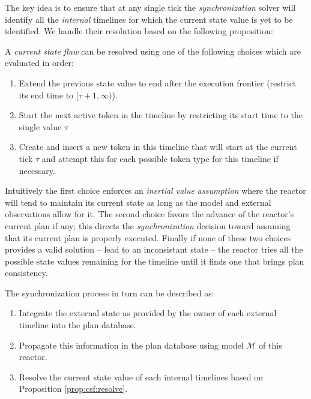 The key idea is to ensure that at any single tick the {\em
  synchronization} solver will identify all the {\em internal}
timelines for which the current state value is yet to be
identified. We handle their resolution based on the following
proposition:

\begin{proposition}
  \label{prop:csf:resolve}
  A {\em current state flaw} can be resolved using one of the
  following choices which are evaluated in order:

  \begin{enumerate}

  \item Extend the previous state value to end after the execution
    frontier (\ie restrict its end time to $[\tau+1, \infty)$).

  \item Start the next active token in the timeline by restricting its
    start time to the single value $\tau$

  \item Create and insert a new token in this timeline that will start
    at the current tick $\tau$ and attempt this for each possible
    token type for this timeline if necessary.

\end{enumerate}
\end{proposition}

Intuitively the first choice enforces an \emph{inertial value
  assumption} where the reactor will tend to maintain its current
state as long as the model and external observations allow for it. The
second choice favors the advance of the reactor's current plan if any;
this directs the {\em synchronization} decision toward assuming that
its current plan is properly executed. Finally if none of these two
choices provides a valid solution -- \ie lead to an inconsistant state
-- the reactor tries all the possible state values remaining for the
timeline until it finds one that brings plan consistency.



The synchronization process in turn can be described as:

\begin{enumerate}

\item Integrate the external state as provided by the owner of each
  external timeline into the plan database.

\item Propagate this information in the plan database using model
  $\mathcal{M}$ of this reactor.

\item Resolve the current state value of each internal timelines based
  on Proposition \ref{prop:csf:resolve}.

\end{enumerate}

